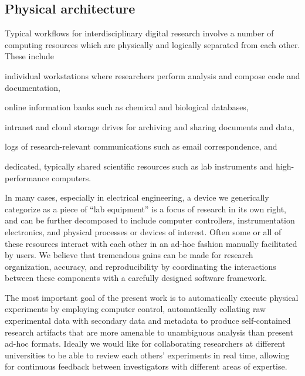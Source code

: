 \documentclass[../thesis]{subfiles}
\begin{document}
\subsection{Physical architecture}
Typical workflows for interdisciplinary digital research involve a
number of computing resources which are physically and logically
separated from each other. These include
\begin{enumerate*}[label=(\roman*)]
  \item{
      individual workstations where researchers perform analysis and
      compose code and documentation,
  }
  \item{
      online information banks such as chemical and biological
      databases,
  }
  \item{
      intranet and cloud storage drives for archiving and sharing
      documents and data,
  }
  \item{
      logs of research-relevant communications such as email
      correspondence, and
  }
  \item{
      dedicated, typically shared scientific resources such as lab
      instruments and high-performance computers.
  }
\end{enumerate*}
In many cases, especially in electrical engineering, a
device we generically categorize as a piece of ``lab equipment'' is a
focus of research in its own right, and can be further decomposed to
include computer controllers, instrumentation electronics, and
physical processes or devices of interest. Often some or all of these
resources interact with each other in an ad-hoc fashion manually
facilitated by users. We believe that tremendous gains can be made for
research organization, accuracy, and reproducibility by coordinating
the interactions between these components with a carefully designed
software framework. %


The most important goal of the present work is to automatically
execute physical experiments by employing computer control,
automatically collating raw experimental data with secondary data and
metadata to produce self-contained research artifacts that are more
amenable to unambiguous analysis than present ad-hoc formats.
Ideally we would like for collaborating researchers at different
universities to be able to review each others' experiments in real
time, allowing for continuous feedback between investigators with
different areas of expertise.
\end{document}
